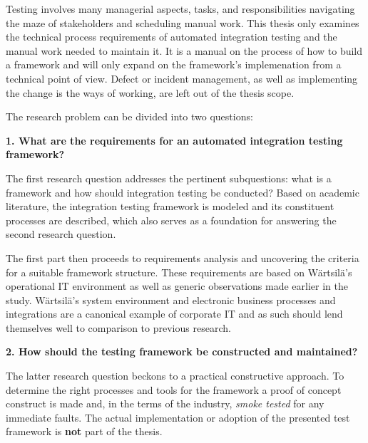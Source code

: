 \documentclass[12pt,a4paper,oneside,pdftex]{report}
\begin{document}
Testing involves many managerial aspects, tasks, and responsibilities navigating the maze of stakeholders and scheduling manual work. This thesis only examines the technical process requirements of automated integration testing and the manual work needed to maintain it. It is a manual on the process of how to build a framework and will only expand on the framework's implemenation from a technical point of view. Defect or incident management, as well as implementing the change is the ways of working, are left out of the thesis scope.

The research problem can be divided into two questions: \\

\begin{adjustwidth}{2.5em}{0pt}
\textbf{1. What are the requirements for an automated integration testing framework?} \\
\end{adjustwidth}

The first research question addresses the pertinent subquestions: what is a framework and how should integration testing be conducted? Based on academic literature, the integration testing framework is modeled and its constituent processes are described, which also serves as a foundation for answering the second research question.

The first part then proceeds to requirements analysis and uncovering the criteria for a suitable framework structure. These requirements are based on Wärtsilä's operational IT environment as well as generic observations made earlier in the study. Wärtsilä's system environment and electronic business processes and integrations are a canonical example of corporate IT and as such should lend themselves well to comparison to previous research. \\


\begin{adjustwidth}{2.5em}{0pt}
\textbf{2. How should the testing framework be constructed and maintained?} \\
\end{adjustwidth}

The latter research question beckons to a practical constructive approach. To determine the right processes and tools for the framework a proof of concept construct is made and, in the terms of the industry, \emph{smoke tested} for any immediate faults. The actual implementation or adoption of the presented test framework is \textbf{not} part of the thesis.
\end{document}

